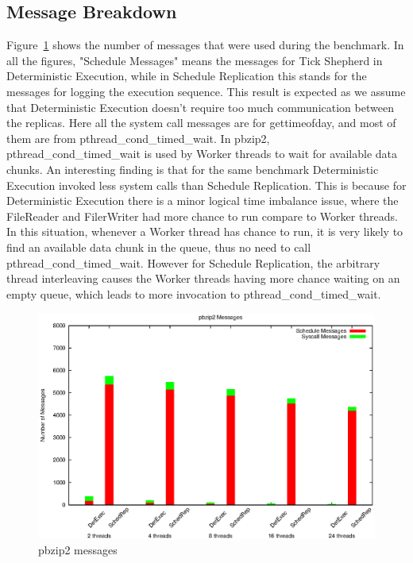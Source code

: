 \subsection{Message Breakdown}
Figure~\ref{f:pbzip2_msg} shows the number of messages that were used during the benchmark. In all the figures, "Schedule Messages" means the messages for Tick Shepherd in Deterministic Execution, while in Schedule Replication this stands for the messages for logging the execution sequence. This result is expected as we assume that Deterministic Execution doesn't require too much communication between the replicas. Here all the system call messages are for gettimeofday, and most of them are from pthread\_cond\_timed\_wait. In pbzip2, pthread\_cond\_timed\_wait is used by Worker threads to wait for available data chunks. An interesting finding is that for the same benchmark Deterministic Execution invoked less system calls than Schedule Replication. This is because for Deterministic Execution there is a minor logical time imbalance issue, where the FileReader and FilerWriter had more chance to run compare to Worker threads. In this situation, whenever a Worker thread has chance to run, it is very likely to find an available data chunk in the queue, thus no need to call pthread\_cond\_timed\_wait. However for Schedule Replication, the arbitrary thread interleaving causes the Worker threads having more chance waiting on an empty queue, which leads to more invocation to pthread\_cond\_timed\_wait.
\begin{figure}
\centering
\includegraphics[width=1\columnwidth]{figures/pbzip2_msg}
\caption{pbzip2 messages}
\label{f:pbzip2_msg}
\end{figure}

